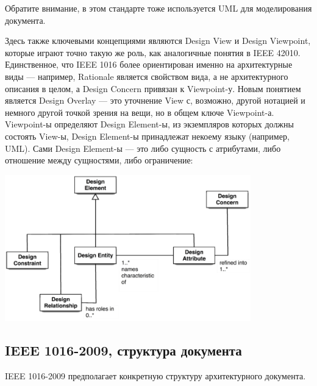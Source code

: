 \documentclass[a5paper]{article}
\begin{document}
Обратите внимание, в этом стандарте тоже используется UML для моделирования документа.

Здесь также ключевыми концепциями являются Design View и Design Viewpoint, которые играют точно такую же роль, как аналогичные понятия в IEEE 42010. Единственное, что IEEE 1016 более ориентирован именно на архитектурные виды --- например, Rationale является свойством вида, а не архитектурного описания в целом, а Design Concern привязан к Viewpoint-у. Новым понятием является Design Overlay --- это уточнение View с, возможно, другой нотацией и немного другой точкой зрения на вещи, но в общем ключе Viewpoint-а. Viewpoint-ы определяют Design Element-ы, из экземпляров которых должны состоять View-ы, Design Element-ы принадлежат некоему языку (например, UML). Сами Design Element-ы --- это либо сущность с атрибутами, либо отношение между сущностями, либо ограничение:

\begin{center}
    \includegraphics[width=0.8\textwidth]{ieee1016ArchitectureElements.png}
\end{center}

\subsection{IEEE 1016-2009, структура документа}

IEEE 1016-2009 предполагает конкретную структуру архитектурного документа.
\end{document}
